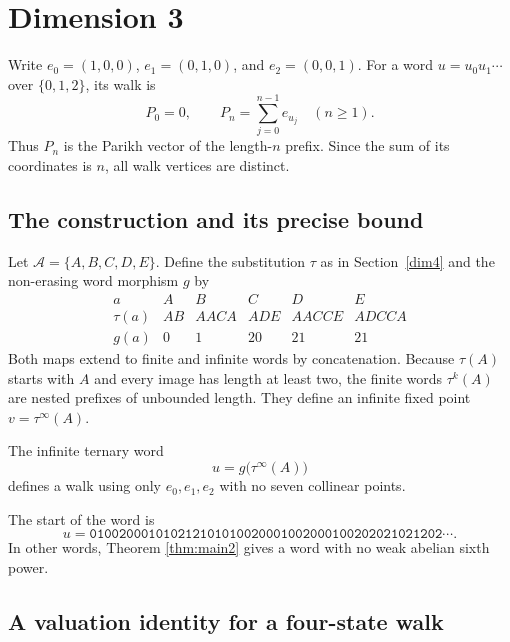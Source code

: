 \documentclass[12pt,reqno]{article}
\newcommand{\word}[1]{\mathtt{#1}}
\begin{document}
\section{Dimension 3}

 Write $e_0=(1,0,0)$, $e_1=(0,1,0)$, and $e_2=(0,0,1)$.
For a word $u=u_0u_1\cdots$ over $\{0,1,2\}$, its walk is
\[
 P_0=0,\qquad P_n=\sum_{j=0}^{n-1}e_{u_j}\quad(n\geq1).
\]
Thus $P_n$ is the Parikh vector of the length-$n$ prefix. Since the sum
of its coordinates is $n$, all walk vertices are distinct.

\subsection{The construction and its precise bound}

Let $\mathcal A=\{A,B,C,D,E\}$. Define the substitution $\tau$ as in Section~\ref{dim4} and
the non-erasing word morphism $g$ by
\[
\begin{array}{c|ccccc}
 a&A&B&C&D&E\\\hline
 \tau(a)&AB&AACA&ADE&AACCE&ADCCA\\
 g(a)&0&1&20&21&21
\end{array}
\]
Both maps extend to finite and infinite words by concatenation. Because
$\tau(A)$ starts with $A$ and every image has length at least two, the
finite words $\tau^k(A)$ are nested prefixes of unbounded length.
They define an infinite fixed point $v=\tau^\infty(A)$.

\begin{theorem}\label{thm:main2}
The infinite ternary word
\[
 u=g\bigl(\tau^\infty(A)\bigr)
\]
defines a walk using only $e_0,e_1,e_2$ with no seven collinear points.
\end{theorem}

The start of the word is
\[
 u=\word{010020001010212101010020001002000100202021021202}\cdots.
\]
 In other words, Theorem
\ref{thm:main2} gives a word with no weak abelian sixth power.

\subsection{A valuation identity for a four-state walk}
\end{document}
